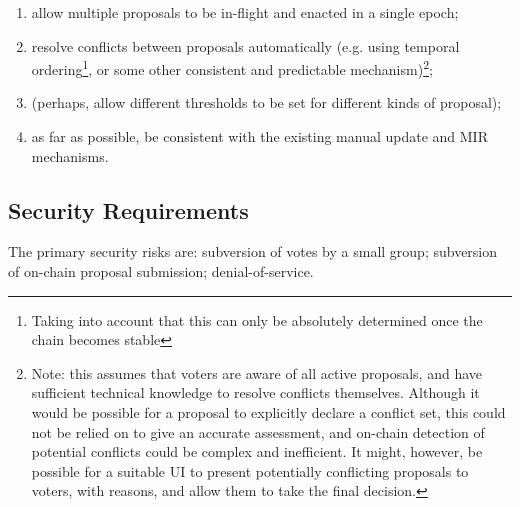\begin{enumerate}[resume]
\item
  allow multiple proposals to be in-flight and enacted in a single epoch;
\item
  resolve conflicts between proposals automatically (e.g. using temporal ordering\footnote{Taking into account that this can only be absolutely determined once the chain becomes stable}, or some other consistent and predictable mechanism)\footnote{Note: this assumes that voters are aware of all active proposals, and have sufficient technical knowledge to resolve conflicts themselves.  Although it would be possible for a proposal to explicitly declare a conflict set, this could not be relied on to give an accurate assessment, and on-chain detection of potential conflicts could be complex and inefficient. It might, however, be possible for a suitable UI to present potentially conflicting proposals to voters, with reasons, and allow them to take the final decision.};
\item
  (perhaps, allow different thresholds to be set for different kinds of proposal);
\item
  as far as possible, be consistent with the existing manual update and MIR mechanisms.
\end{enumerate}

\pagebreak
\subsection{Security Requirements}
\label{sect:security}

The primary security risks are: subversion of votes by a small group; subversion of on-chain proposal submission; denial-of-service.

